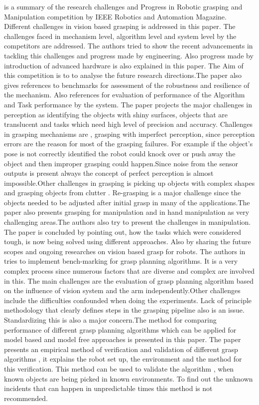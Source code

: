 {\cite{author21} is a summary of the research challenges and Progress in Robotic grasping and Manipulation competition by IEEE Robotics and Automation Magazine. Different challenges in vision based grasping is addressed in this paper. The challenges faced in mechanism level, algorithm level and system level by the competitors are addressed. The authors tried to show the recent advancements in tackling this challenges and progress made by engineering. Also progress made by introduction of advanced hardware is also explained in this paper. The Aim of this competition is to to analyse the future research directions.The paper also gives references to benchmarks for assessment of the robustness and resilience of the mechanism. Also references for evaluation of performance of the Algorithm and Task performance by the system.
The paper projects the major challenges in perception as identifying the objects with shiny surfaces, objects that are translucent and tasks which need high level of precision and accuracy. Challenges in grasping mechanisms are , grasping with imperfect perception, since perception errors are the reason for most of the grasping failures. For example if the object's pose is not correctly identified the robot could knock over or push away the object and then improper grasping could happen.Since noise from the sensor outputs is present always the concept of perfect perception is almost impossible.Other challenges in grasping is picking up objects with complex shapes and grasping objects from clutter . Re-grasping is a major challenge since the objects needed to be adjusted after initial grasp in many of the applications.The paper also presents grasping for manipulation and in hand manipulation as very challenging areas.The authors also try to present the challenges in manipulation. 
The paper is concluded by pointing out, how the tasks which were considered tough, is now being solved using different approaches. Also by sharing the future scopes and ongoing researches on vision based grasp for robots.
 The authors in \cite{author22} tries to implement bench-marking for grasp planning algorithms. It is a very complex process since numerous factors that are diverse and complex are involved in this. The main challenges are the evaluation of grasp planning algorithm based on the influence of vision system and the arm independently.Other challenges include the difficulties confounded when doing the experiments. 
 Lack of principle methodology that clearly defines steps in the grasping pipeline also is an issue. Standardizing this is also a major concern.The method for comparing performance of different grasp planning algorithms which can be applied for model based and model free approaches is presented in this paper. The paper presents an empirical method of verification and validation of different grasp algorithms , it explains the robot set up, the environment and the method for this verification. This method can be used to validate the algorithm , when known objects are being picked in known environments. To find out the unknown incidents that can happen in unpredictable times this method is not recommended. 
}

